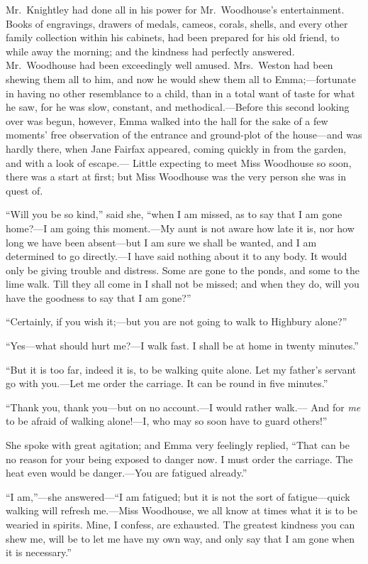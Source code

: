 Mr.\ Knightley had done all in his power for Mr.\ Woodhouse's
entertainment.  Books of engravings, drawers of medals, cameos,
corals, shells, and every other family collection within his cabinets,
had been prepared for his old friend, to while away the morning;
and the kindness had perfectly answered.  Mr.\ Woodhouse had been
exceedingly well amused.  Mrs.\ Weston had been shewing them all to him,
and now he would shew them all to Emma;---fortunate in having no other
resemblance to a child, than in a total want of taste for what he saw,
for he was slow, constant, and methodical.---Before this second looking
over was begun, however, Emma walked into the hall for the sake
of a few moments' free observation of the entrance and ground-plot
of the house---and was hardly there, when Jane Fairfax appeared,
coming quickly in from the garden, and with a look of escape.---%
Little expecting to meet Miss Woodhouse so soon, there was a start
at first; but Miss Woodhouse was the very person she was in quest of.

``Will you be so kind,'' said she, ``when I am missed, as to say
that I am gone home?---I am going this moment.---My aunt is not aware
how late it is, nor how long we have been absent---but I am sure we
shall be wanted, and I am determined to go directly.---I have said
nothing about it to any body.  It would only be giving trouble
and distress.  Some are gone to the ponds, and some to the lime walk.
Till they all come in I shall not be missed; and when they do,
will you have the goodness to say that I am gone?''

``Certainly, if you wish it;---but you are not going to walk
to Highbury alone?''

``Yes---what should hurt me?---I walk fast.  I shall be at home
in twenty minutes.''

``But it is too far, indeed it is, to be walking quite alone.
Let my father's servant go with you.---Let me order the carriage.
It can be round in five minutes.''

``Thank you, thank you---but on no account.---I would rather walk.---%
And for \emph{me} to be afraid of walking alone!---I, who may so soon have
to guard others!''

She spoke with great agitation; and Emma very feelingly replied,
``That can be no reason for your being exposed to danger now.
I must order the carriage.  The heat even would be danger.---You are
fatigued already.''

``I am,''---she answered---``I am fatigued; but it is not the sort
of fatigue---quick walking will refresh me.---Miss Woodhouse, we all
know at times what it is to be wearied in spirits.  Mine, I confess,
are exhausted.  The greatest kindness you can shew me, will be to let
me have my own way, and only say that I am gone when it is necessary.''

